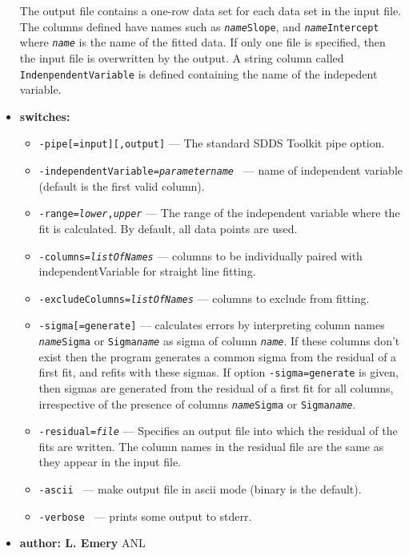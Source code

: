 \begin{itemize}
The output file contains a one-row data set for each data set in the 
input file. The columns defined have names
such as {\tt {\em name}Slope}, and {\tt {\em name}Intercept} where {\tt {\em name}} is the name of
the fitted data.  If only one file is specified, then the input file is 
overwritten by the output.
A string column called \verb+IndenpendentVariable+ is defined containing the name of the indepedent variable.

\item {\bf switches:}
%
%
    \begin{itemize}
    \item {\tt  -pipe[=input][,output]} --- The standard SDDS Toolkit pipe option.
    \item {\tt  -independentVariable={\em parametername} }
        --- name of independent variable (default is the first valid column).
    \item {\tt  -range={\em lower},{\em upper}} --- The range of the independent
        variable where the fit is calculated. By default, all data points are used.
    \item {\tt  -columns={\em listOfNames}}   
        ---  columns to be individually paired with independentVariable 
        for straight line fitting.
    \item {\tt  -excludeColumns={\em listOfNames}}  ---  columns to exclude from fitting.
    \item {\tt  -sigma[=generate]}  
        ---   calculates errors by interpreting column names 
        {\tt {\em name}Sigma} or {\tt Sigma{\em name}} as
        sigma of column {\tt {\em name}}. If these columns don't exist
        then the program generates a common sigma from the residual of a first fit,
        and refits with these sigmas. If option {\tt -sigma=generate} is given,
        then sigmas are generated from the residual of a first fit for all columns,
        irrespective of the presence of columns {\tt {\em name}Sigma} or {\tt Sigma{\em name}}.
    \item {\tt -residual={\em file}} --- Specifies an output file into which the
        residual of the fits are written. The column names in the residual file
         are the same as they appear in the input file.
    \item {\tt  -ascii }    ---  make output file in ascii mode (binary is the default).
    \item {\tt  -verbose }  ---  prints some output to stderr.

    \end{itemize}
%
%
%
%
\item {\bf author: L. Emery } ANL
\end{itemize}

